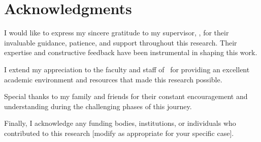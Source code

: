 
\chapter*{Acknowledgments}
\thispagestyle{plain}

I would like to express my sincere gratitude to my supervisor, \thesissupervisor, for their invaluable guidance, patience, and support throughout this research. Their expertise and constructive feedback have been instrumental in shaping this work.

I extend my appreciation to the faculty and staff of \thesisdepartment\ for providing an excellent academic environment and resources that made this research possible.

Special thanks to my family and friends for their constant encouragement and understanding during the challenging phases of this journey.

Finally, I acknowledge any funding bodies, institutions, or individuals who contributed to this research [modify as appropriate for your specific case].
